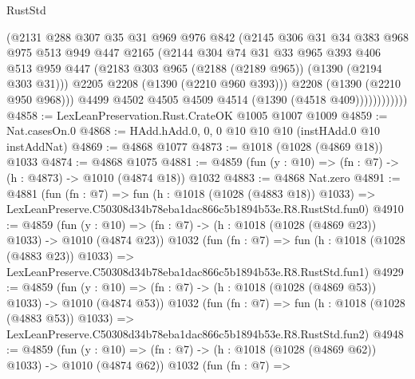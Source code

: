 \begin{lexlean}{RustStd}
\begin{coremodule}
                      (@2131
                        @288
                        @307
                        @35
                        @31
                        @969
                        @976
                        @842
                        (@2145
                          @306
                          @31
                          @34
                          @383
                          @968
                          @975
                          @513
                          @949
                          @447
                          @2165
                          (@2144
                            @304
                            @74
                            @31
                            @33
                            @965
                            @393
                            @406
                            @513
                            @959
                            @447
                            (@2183 @303 @965 (@2188 (@2189 @965)) (@1390 (@2194 @303 @31)))
                            @2205
                            @2208
                            (@1390 (@2210 @960 @393)))
                          @2208
                          (@1390 (@2210 @950 @968)))
                        @4499
                        @4502
                        @4505
                        @4509
                        @4514
                        (@1390 (@4518 @409))))))))))))
@4858 := LexLeanPreservation.Rust.CrateOK @1005 @1007 @1009
@4859 := Nat.casesOn.{0}
@4868 := HAdd.hAdd.{0, 0, 0} @10 @10 @10 (instHAdd.{0} @10 instAddNat)
@4869 := @4868 @1077
@4873 := @1018 (@1028 (@4869 @18)) @1033
@4874 := @4868 @1075
@4881 := @4859 (fun (y : @10) => (fn : @7) -> (h : @4873) -> @1010 (@4874 @18)) @1032
@4883 := @4868 Nat.zero
@4891 := @4881
    (fun (fn : @7) =>
    fun (h : @1018 (@1028 (@4883 @18)) @1033) =>
    LexLeanPreserve.C50308d34b78eba1dac866c5b1894b53e.R8.RustStd.fun0)
@4910 := @4859
    (fun (y : @10) => (fn : @7) -> (h : @1018 (@1028 (@4869 @23)) @1033) -> @1010 (@4874 @23))
    @1032
    (fun (fn : @7) =>
    fun (h : @1018 (@1028 (@4883 @23)) @1033) =>
    LexLeanPreserve.C50308d34b78eba1dac866c5b1894b53e.R8.RustStd.fun1)
@4929 := @4859
    (fun (y : @10) => (fn : @7) -> (h : @1018 (@1028 (@4869 @53)) @1033) -> @1010 (@4874 @53))
    @1032
    (fun (fn : @7) =>
    fun (h : @1018 (@1028 (@4883 @53)) @1033) =>
    LexLeanPreserve.C50308d34b78eba1dac866c5b1894b53e.R8.RustStd.fun2)
@4948 := @4859
    (fun (y : @10) => (fn : @7) -> (h : @1018 (@1028 (@4869 @62)) @1033) -> @1010 (@4874 @62))
    @1032
    (fun (fn : @7) =>

\end{coremodule}
\end{lexlean}
